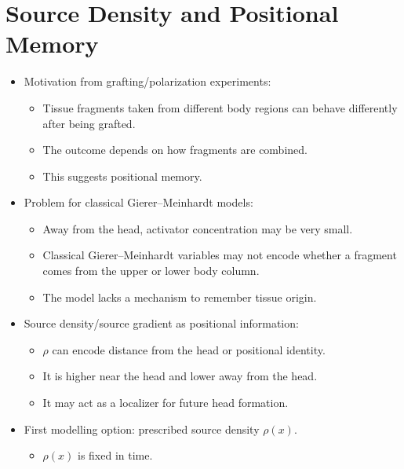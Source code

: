 \section{Source Density and Positional Memory}


\begin{itemize}
    \item Motivation from grafting/polarization experiments:
    \begin{itemize}
        \item Tissue fragments taken from different body regions can behave differently after being grafted.
        \item The outcome depends on how fragments are combined.
        \item This suggests positional memory.
    \end{itemize}
    \item Problem for classical Gierer--Meinhardt models:
    \begin{itemize}
        \item Away from the head, activator concentration may be very small.
        \item Classical Gierer--Meinhardt variables may not encode whether a fragment comes from the upper or lower body column.
        \item The model lacks a mechanism to remember tissue origin.
    \end{itemize}
    \item Source density/source gradient as positional information:
    \begin{itemize}
        \item \(\rho\) can encode distance from the head or positional identity.
        \item It is higher near the head and lower away from the head.
        \item It may act as a localizer for future head formation.
    \end{itemize}
    \item First modelling option: prescribed source density \(\rho(x)\).
    \begin{itemize}
        \item \(\rho(x)\) is fixed in time.

\end{itemize}
\end{itemize}
